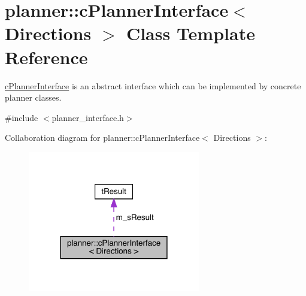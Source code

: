 \hypertarget{classplanner_1_1c_planner_interface}{}\section{planner\+:\+:c\+Planner\+Interface$<$ Directions $>$ Class Template Reference}
\label{classplanner_1_1c_planner_interface}


\mbox{\hyperlink{classplanner_1_1c_planner_interface}{c\+Planner\+Interface}} is an abstract interface which can be implemented by concrete planner classes.  




{\ttfamily \#include $<$planner\+\_\+interface.\+h$>$}



Collaboration diagram for planner\+:\+:c\+Planner\+Interface$<$ Directions $>$\+:\nopagebreak
\begin{figure}[H]
\begin{center}
\leavevmode
\includegraphics[width=213pt]{classplanner_1_1c_planner_interface__coll__graph}
\end{center}
\end{figure}
